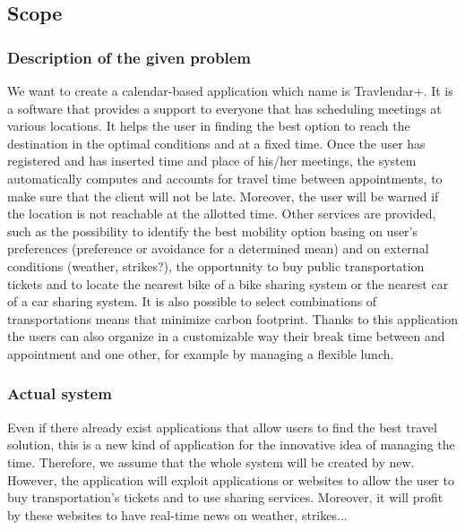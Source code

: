 \documentclass[12pt,titlepage]{article}
\begin{document}
\subsection{Scope}\label{RASD}
\subsubsection{Description of the given problem}\label{RASD}
We want to create a calendar-based application which name is Travlendar+. It is a software that provides a support to everyone that has scheduling meetings at various locations. It helps the user in finding the best option to reach the destination in the optimal conditions and at a fixed time. 
Once the user has registered and has inserted time and place of his/her meetings, the system automatically computes and accounts for travel time between appointments, to make sure that the client will not be late. Moreover, the user will be warned if the location is not reachable at the allotted time. Other services are provided, such as the possibility to identify the best mobility option basing on user's preferences (preference or avoidance for a determined mean) and on external conditions (weather, strikes?), the opportunity to buy public transportation tickets and to locate the nearest bike of a bike sharing system or the nearest car of a car sharing system. It is also possible to select combinations of transportations means that minimize carbon footprint.
Thanks to this application the users can also organize in a customizable way their break time between and appointment and one other, for example by managing a flexible lunch. 

\subsubsection{Actual system}\label{RASD}
Even if there already exist applications that allow users to find the best travel solution, this is a new kind of application for the innovative idea of managing the time. Therefore, we assume that the whole system will be created by new.
However, the application will exploit applications or websites to allow the user to buy transportation's tickets and to use sharing services. Moreover, it will profit by these websites to have real-time news on weather, strikes...
\end{document}
